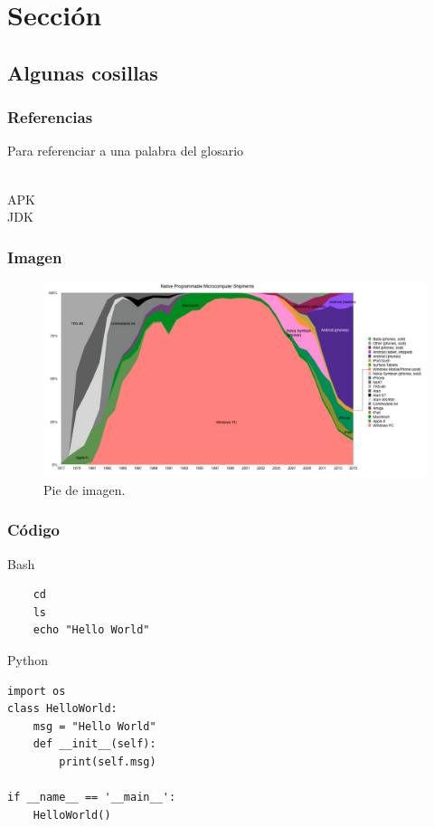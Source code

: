 \section{Sección}

\lipsum[1]

\subsection{Algunas cosillas}


\subsubsection{Referencias}

Para referenciar a una palabra del glosario

 \\
\gls{APK} \\
\gls{JDK} \\
\cite{AngBenNadel}

\subsubsection{Imagen}

\begin{figure}[H]
\centering
  \includegraphics[width=\textwidth]{Figures/ch1/introduction/os_quota}
  \caption{Pie de imagen. }
\end{figure}

\subsubsection{Código}

Bash


\begin{verbatim}
    cd
    ls
    echo "Hello World"
\end{verbatim}

Python


\begin{verbatim}
import os
class HelloWorld:
    msg = "Hello World"
    def __init__(self):
        print(self.msg)

if __name__ == '__main__':
    HelloWorld()	
\end{verbatim}
